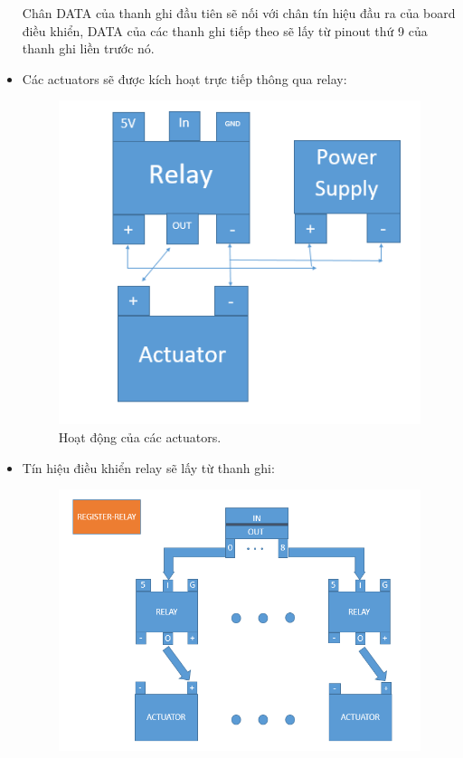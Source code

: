 \documentclass[a4paper,12pt,oneside]{article}
\begin{document}
\begin{itemize}
\noindent Chân DATA của thanh ghi đầu tiên sẽ nối với chân tín hiệu đầu ra của board điều khiển, DATA của các thanh ghi tiếp theo sẽ lấy từ pinout thứ 9 của thanh ghi liền trước nó.
\item Các actuators sẽ được kích hoạt trực tiếp thông qua relay:
\begin{center}
\begin{figure}[h!]
\begin{center}
\includegraphics[scale=0.9]{hinh/actuator.PNG}
\end{center}
\caption{Hoạt động của các actuators.}
\end{figure}
\end{center}
\item Tín hiệu điều khiển relay sẽ lấy từ thanh ghi:
\begin{center}
\begin{figure}[h!]
\begin{center}
\includegraphics[scale=0.7]{hinh/register_relay.PNG}

\end{center}
\end{figure}
\end{center}
\end{itemize}
\end{document}

